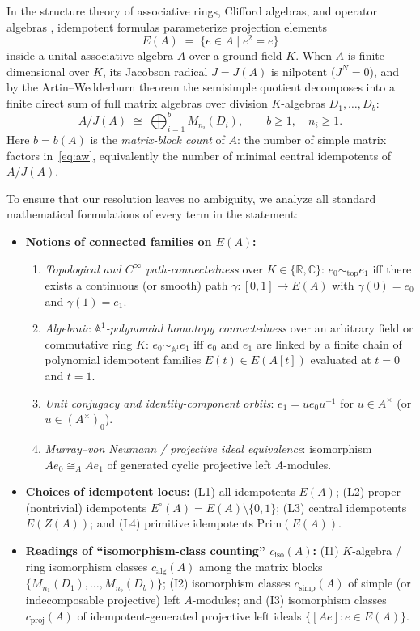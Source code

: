 \documentclass[11pt,a4paper]{article}
\theoremstyle{definition}
\newcommand{\R}{\mathbb{R}}
\newcommand{\C}{\mathbb{C}}
\newcommand{\Prim}{\mathrm{Prim}}
\begin{document}
In the structure theory of associative rings, Clifford algebras, and operator algebras
\cite{Lam,LawsonMichelsohn,Blackadar}, idempotent formulas parameterize projection elements
\[
  E(A) \;=\; \{e \in A \mid e^2 = e\}
\]
inside a unital associative algebra $A$ over a ground field $K$. When $A$ is
finite-dimensional over $K$, its Jacobson radical $J = J(A)$ is nilpotent ($J^N = 0$), and
by the Artin--Wedderburn theorem the semisimple quotient decomposes into a finite direct sum
of full matrix algebras over division $K$-algebras $D_1,\dots,D_b$:
\begin{equation}\label{eq:aw}
  A / J(A) \;\cong\; \bigoplus_{i=1}^{b} M_{n_i}(D_i),
  \qquad b \ge 1,\quad n_i \ge 1.
\end{equation}
Here $b = b(A)$ is the \emph{matrix-block count} of $A$: the number of simple matrix factors
in~\eqref{eq:aw}, equivalently the number of minimal central idempotents of $A/J(A)$.

To ensure that our resolution leaves no ambiguity, we analyze all standard mathematical
formulations of every term in the statement:
\begin{itemize}
  \setlength{\itemsep}{2pt}
  \item \textbf{Notions of connected families on $E(A)$:}
    \begin{enumerate}
      \item[(C1)] \emph{Topological and $C^\infty$ path-connectedness} over $K\in\{\R,\C\}$:
        $e_0 \sim_{\mathrm{top}} e_1$ iff there exists a continuous (or smooth) path
        $\gamma : [0,1]\to E(A)$ with $\gamma(0)=e_0$ and $\gamma(1)=e_1$.
      \item[(C2)] \emph{Algebraic $\mathbb{A}^1$-polynomial homotopy connectedness} over an
        arbitrary field or commutative ring $K$: $e_0 \sim_{\mathbb{A}^1} e_1$ iff $e_0$ and
        $e_1$ are linked by a finite chain of polynomial idempotent families
        $E(t)\in E(A[t])$ evaluated at $t=0$ and $t=1$.
      \item[(C3)] \emph{Unit conjugacy and identity-component orbits}: $e_1 = u e_0 u^{-1}$
        for $u \in A^\times$ (or $u\in (A^\times)_0$).
      \item[(C4)] \emph{Murray--von Neumann / projective ideal equivalence}: isomorphism
        $Ae_0 \cong_A Ae_1$ of generated cyclic projective left $A$-modules.
    \end{enumerate}
  \item \textbf{Choices of idempotent locus:}
    (L1) all idempotents $E(A)$;
    (L2) proper (nontrivial) idempotents $E^\circ(A) = E(A)\setminus\{0,1\}$;
    (L3) central idempotents $E(Z(A))$; and
    (L4) primitive idempotents $\Prim(E(A))$.
  \item \textbf{Readings of ``isomorphism-class counting'' $c_{\mathrm{iso}}(A)$:}
    (I1) $K$-algebra / ring isomorphism classes $c_{\mathrm{alg}}(A)$ among the matrix blocks
    $\{M_{n_1}(D_1),\dots,M_{n_b}(D_b)\}$;
    (I2) isomorphism classes $c_{\mathrm{simp}}(A)$ of simple (or indecomposable projective)
    left $A$-modules; and
    (I3) isomorphism classes $c_{\mathrm{proj}}(A)$ of idempotent-generated projective left
    ideals $\{[Ae] : e\in E(A)\}$.
\end{itemize}
\end{document}
